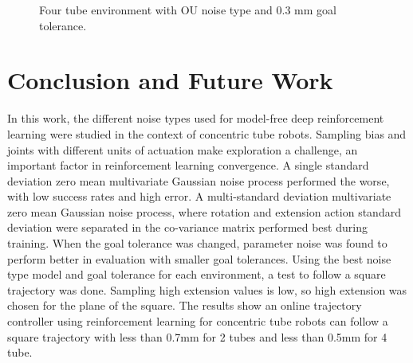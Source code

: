 \begin{figure}
    \caption{Four tube environment with OU noise type and 0.3 mm goal tolerance.}
    \label{fig:four-tube-traj}
\end{figure}



\section{Conclusion and Future Work}
In this work, the different noise types used for model-free deep reinforcement learning were studied in the context of concentric tube robots. Sampling bias and joints with different units of actuation make exploration a challenge, an important factor in reinforcement learning convergence. A single standard deviation zero mean multivariate Gaussian noise process performed the worse, with low success rates and high error. A multi-standard deviation multivariate zero mean Gaussian noise process, where rotation and extension action standard deviation were separated in the co-variance matrix performed best during training. When the goal tolerance was changed, parameter noise was found to perform better in evaluation with smaller goal tolerances. Using the best noise type model and goal tolerance for each environment, a test to follow a square trajectory was done. Sampling high extension values is low, so high extension was chosen for the plane of the square. The results show an online trajectory controller using reinforcement learning for concentric tube robots can follow a square trajectory with less than 0.7mm for 2 tubes and less than 0.5mm for 4 tube.

